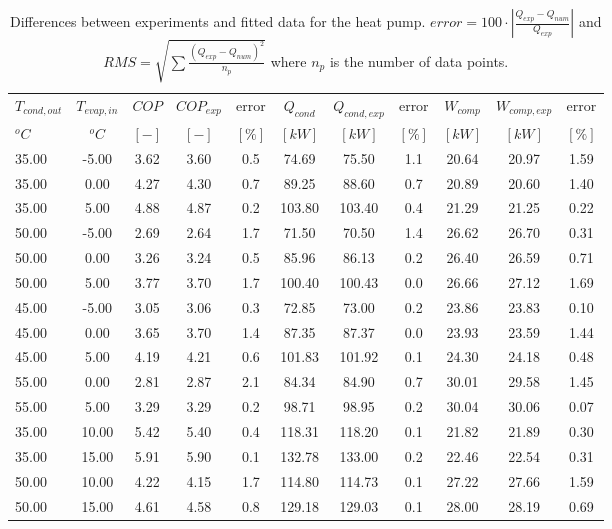 \documentclass[english]{SPFShortReport}
\begin{document}
\begin{table}[!ht]
\begin{small}
\caption{Differences between experiments and fitted data for the heat pump.          $error=100 \cdot |\frac{Q_{exp}-Q_{num}}{Q_{exp}}|$ and $RMS = \sqrt { \sum{\frac{(Q_{exp}-Q_{num})^2}{n_p}} }$ where $n_p$ is the number of data points.}
\begin{center}
\resizebox{12cm}{!} 
{
\begin{tabular}{l | c c c c c c c c c c } 
\hline
\hline
$T_{cond,out}$ &$T_{evap,in}$ &$COP$ &$COP_{exp}$ &error &$Q_{cond}$ &$Q_{cond,exp}$ &error &$W_{comp}$ &$W_{comp,exp}$ &error \\ 
$^oC$ &$^oC$ &$[-]$ &$[-]$ &$[\%]$ &$[kW]$ &$[kW]$ &$[\%]$ &$[kW]$ &$[kW]$ &$[\%]$\\ 
\hline
35.00  & -5.00 & 3.62 & 3.60 & 0.5 & 74.69 & 75.50 & 1.1 & 20.64 & 20.97 & 1.59\\ 
35.00  & 0.00 & 4.27 & 4.30 & 0.7 & 89.25 & 88.60 & 0.7 & 20.89 & 20.60 & 1.40\\ 
35.00  & 5.00 & 4.88 & 4.87 & 0.2 & 103.80 & 103.40 & 0.4 & 21.29 & 21.25 & 0.22\\ 
50.00  & -5.00 & 2.69 & 2.64 & 1.7 & 71.50 & 70.50 & 1.4 & 26.62 & 26.70 & 0.31\\ 
50.00  & 0.00 & 3.26 & 3.24 & 0.5 & 85.96 & 86.13 & 0.2 & 26.40 & 26.59 & 0.71\\ 
50.00  & 5.00 & 3.77 & 3.70 & 1.7 & 100.40 & 100.43 & 0.0 & 26.66 & 27.12 & 1.69\\ 
45.00  & -5.00 & 3.05 & 3.06 & 0.3 & 72.85 & 73.00 & 0.2 & 23.86 & 23.83 & 0.10\\ 
45.00  & 0.00 & 3.65 & 3.70 & 1.4 & 87.35 & 87.37 & 0.0 & 23.93 & 23.59 & 1.44\\ 
45.00  & 5.00 & 4.19 & 4.21 & 0.6 & 101.83 & 101.92 & 0.1 & 24.30 & 24.18 & 0.48\\ 
55.00  & 0.00 & 2.81 & 2.87 & 2.1 & 84.34 & 84.90 & 0.7 & 30.01 & 29.58 & 1.45\\ 
55.00  & 5.00 & 3.29 & 3.29 & 0.2 & 98.71 & 98.95 & 0.2 & 30.04 & 30.06 & 0.07\\ 
35.00  & 10.00 & 5.42 & 5.40 & 0.4 & 118.31 & 118.20 & 0.1 & 21.82 & 21.89 & 0.30\\ 
35.00  & 15.00 & 5.91 & 5.90 & 0.1 & 132.78 & 133.00 & 0.2 & 22.46 & 22.54 & 0.31\\ 
50.00  & 10.00 & 4.22 & 4.15 & 1.7 & 114.80 & 114.73 & 0.1 & 27.22 & 27.66 & 1.59\\ 
50.00  & 15.00 & 4.61 & 4.58 & 0.8 & 129.18 & 129.03 & 0.1 & 28.00 & 28.19 & 0.69\\ 

\end{tabular}}
\end{center}
\end{small}
\end{table}
\end{document}
